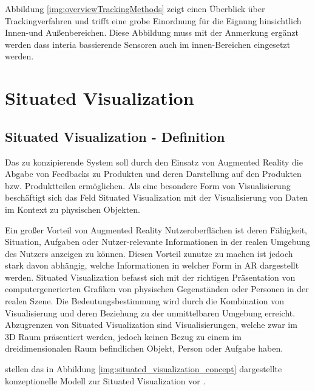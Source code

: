 Abbildung \ref{img:overviewTrackingMethods} zeigt einen Überblick über Trackingverfahren und trifft eine grobe Einordnung für die Eignung hinsichtlich Innen-und Außenbereichen.
Diese Abbildung muss mit der Anmerkung ergänzt werden dass interia bassierende Sensoren auch im innen-Bereichen eingesetzt werden. 

\section{Situated Visualization}
\subsection{Situated Visualization - Definition}


Das zu konzipierende System soll durch den Einsatz von Augmented Reality die Abgabe von Feedbacks zu Produkten und deren Darstellung auf den Produkten bzw. Produktteilen ermöglichen. 
Als eine besondere Form von Visualisierung beschäftigt sich das Feld Situated Visualization mit der Visualisierung von Daten im Kontext zu physischen Objekten. 

\cite[S.~239]{DieterSchmalstieg2016} Ein großer Vorteil von Augmented Reality Nutzeroberflächen ist deren Fähigkeit, Situation, Aufgaben oder Nutzer-relevante Informationen in 
der realen Umgebung des Nutzers anzeigen zu können. Diesen Vorteil zunutze zu machen ist jedoch stark davon abhängig, welche Informationen in welcher Form in AR dargestellt werden.
Situated Visualization befasst sich mit der richtigen Präsentation von computergenerierten
Grafiken von physischen Gegenständen oder Personen in der realen Szene. \cite[S.~188]{Marriott2018} Die Bedeutungsbestimmung wird durch die Kombination von Visualisierung und deren 
Beziehung zu der unmittelbaren Umgebung erreicht. \cite[S.~240]{DieterSchmalstieg2016} Abzugrenzen von Situated Visualization sind Visualisierungen, welche zwar im 3D Raum präsentiert werden, jedoch keinen Bezug zu einem im dreidimensionalen Raum befindlichen Objekt, Person oder Aufgabe haben.

\citeauthor{Willett2017} stellen das in Abbildung \ref{img:situated_visualization_concept} dargestellte konzeptionelle Modell 
zur Situated Visualization vor\cite[S.~2]{Willett2017} \cite[S.~192]{Marriott2018}.


